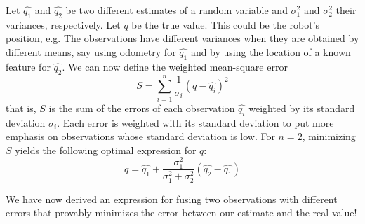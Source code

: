  Let $ \hat{q_1}$ and $ \hat{q_2}$ be two different estimates of a random variable and $ \sigma^2_1$ and $ \sigma^2_2$ their variances, respectively. Let $ q$ be the true value. This could be the robot's position, e.g.  The observations have different variances when they are obtained by  different means, say using odometry for $ \hat{q_1}$ and by using the location of a known feature for $ \hat{q_2}$. We can now define the weighted mean-square error
 \begin{equation}
S=\displaystyle\sum_{i=1}^{n}\frac{1}{\sigma_i} (q-\hat{q_i})^2
\end{equation}
that is, $ S$ is the sum of the errors of each observation $ \hat{q_i}$ weighted by its standard deviation $ \sigma_i$. Each error is weighted  with its standard deviation to put more emphasis on observations whose standard deviation is low. For $n=2$, minimizing  $ S$ yields the following optimal expression for $ q$:
\begin{equation}\label{eq:kalmanderiv}
q=\hat{q_1}+\frac{\sigma_1^2}{\sigma_1^2+\sigma_2^2}(\hat{q_2}-\hat{q_1})
\end{equation}

We have now derived an expression for fusing two observations with different errors that provably minimizes the error between our estimate and the real value!

